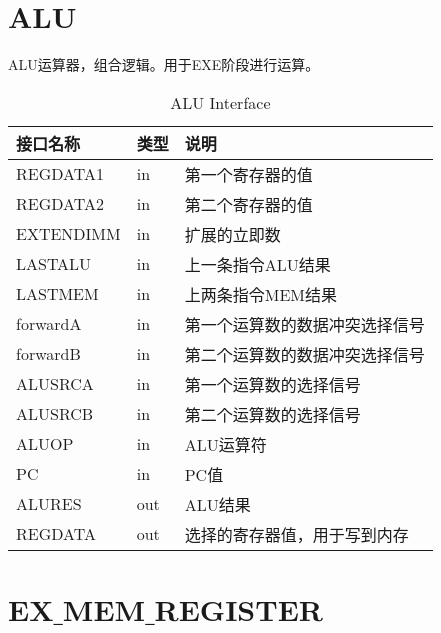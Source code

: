 
\section{ALU}

ALU运算器，组合逻辑。用于EXE阶段进行运算。

\begin{table}[H]
\begin{center}
\renewcommand{\arraystretch}{1.3}
\small
\caption{ALU Interface}
\label{tab:treatments}
\begin{tabular}{|p{3cm}<{\centering}|p{1.4cm}<{\centering}|p{7cm}<{\centering}|}
\hline
接口名称 & 类型 & 说明 \\
\hline
REGDATA1 & in & 第一个寄存器的值 \\
\hline
REGDATA2 & in & 第二个寄存器的值 \\
\hline
EXTENDIMM & in & 扩展的立即数 \\
\hline
LASTALU & in & 上一条指令ALU结果 \\
\hline
LASTMEM & in & 上两条指令MEM结果 \\
\hline
forwardA & in & 第一个运算数的数据冲突选择信号 \\
\hline
forwardB & in & 第二个运算数的数据冲突选择信号 \\
\hline
ALUSRCA & in & 第一个运算数的选择信号 \\
\hline
ALUSRCB & in &  第二个运算数的选择信号 \\
\hline
ALUOP & in & ALU运算符 \\
\hline
PC & in & PC值 \\
\hline
ALURES & out & ALU结果 \\
\hline
REGDATA & out & 选择的寄存器值，用于写到内存 \\
\hline
\end{tabular}
\end{center}
\end{table}


\section{EX$\_$MEM$\_$REGISTER}

